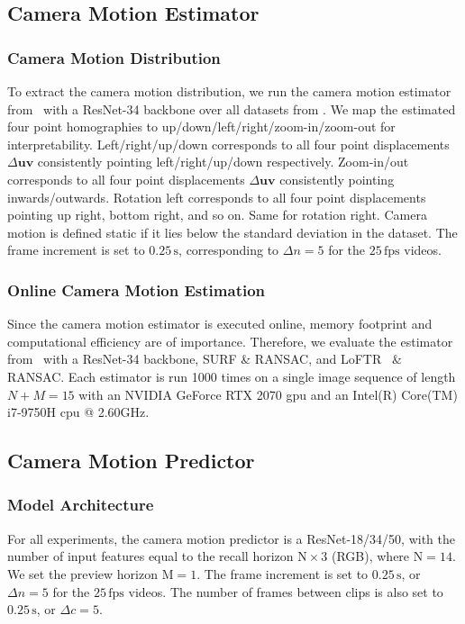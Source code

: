 \subsection{Camera Motion Estimator}
\label{c4:sec:camera_motion_estimator}
\subsubsection{Camera Motion Distribution} 
To extract the camera motion distribution, we run the camera motion estimator from~\cite{huber2022deep} with a ResNet-34 backbone over all datasets from . We map the estimated four point homographies to up/down/left/right/zoom-in/zoom-out for interpretability. Left/right/up/down corresponds to all four point displacements $\Delta\mathbf{uv}$ consistently pointing left/right/{\allowbreak}up/down respectively.
Zoom-in/out corresponds to all four point displacements $\Delta\mathbf{uv}$ consistently pointing inwards/outwards. Rotation left corresponds to all four point displacements pointing up right, bottom right, and so on. Same for rotation right. Camera motion is defined static if it lies below the standard deviation in the dataset. The frame increment is set to $0.25\,\text{s}$, corresponding to $\Delta n = 5$ for the $25\,\text{fps}$ videos.

\subsubsection{Online Camera Motion Estimation}
\label{c4:sec:online_camera_motion_estimation}
Since the camera motion estimator is executed online, memory footprint and computational efficiency are of importance. Therefore, we evaluate the estimator from~\cite{huber2022deep} with a ResNet-34 backbone, SURF \& RANSAC, and LoFTR~\cite{sun2021loftr} \& RANSAC. Each estimator is run 1000 times on a single image sequence of length $N+M=15$ with an NVIDIA GeForce RTX 2070 \gls{gpu} and an Intel(R) Core(TM) i7-9750H \gls{cpu} @ 2.60GHz.

\subsection{Camera Motion Predictor}
\label{c4:sec:camera_motion_predictor_experiments}
\subsubsection{Model Architecture}
\label{c4:sec:model_architecture}
For all experiments, the camera motion predictor is a ResNet-18/34/50, with the number of input features equal to the recall horizon $\text{N}\times3$ (RGB), where $\text{N}=14$. We set the preview horizon $\text{M}=1$. The frame increment is set to $0.25\,\text{s}$, or $\Delta n = 5$ for the $25\,\text{fps}$ videos. The number of frames between clips is also set to $0.25\,\text{s}$, or $\Delta c = 5$.

